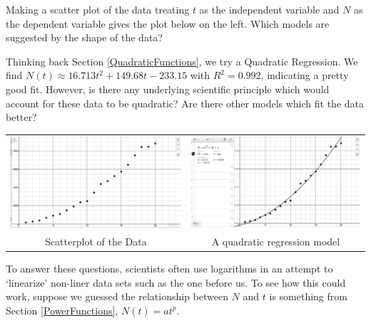 Making a scatter plot of the data treating $t$ as the independent variable and $N$ as the dependent variable gives the plot below on the left.  Which models are suggested by the shape of the data?  

\smallskip

Thinking back Section \ref{QuadraticFunctions}, we try a Quadratic Regression.  We find $N(t) \approx 16.713 t^2 +149.68t -233.15$ with $R^2 = 0.992$, indicating a pretty good fit.  However, is there any underlying scientific principle which would account for these data to be quadratic?  Are there other models which fit the data  better?


\begin{center}

\begin{tabular}{cc}

\includegraphics[width=3in]{./ApplicationsofExponentialandLogarithmicFunctionsGraphics/ExpLogAppEx04.jpg} &

\includegraphics[width=3in]{./ApplicationsofExponentialandLogarithmicFunctionsGraphics/ExpLogAppEx05.jpg} \\

Scatterplot of the Data &

A quadratic regression model \\

\end{tabular}

\end{center}

To answer these questions, scientists often use logarithms in an attempt to `linearize' non-liner data sets such as the one before us.  To see how this could work, suppose we guessed the relationship between $N$ and $t$ is something from Section \ref{PowerFunctions},  $N(t) = a t^{p}$.  

